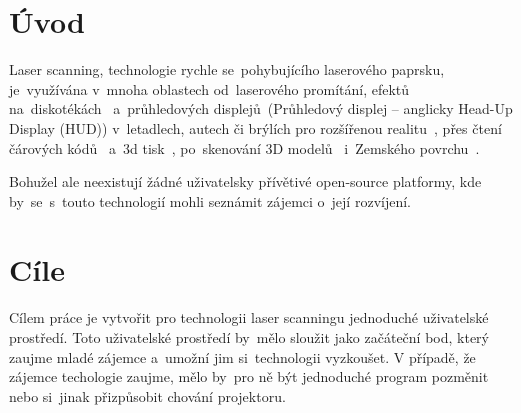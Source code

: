 \chapter*{Úvod}


Laser scanning, technologie rychle se~pohybujícího laserového paprsku, je~využívána v~mnoha oblastech od~laserového promítání, efektů na~diskotékách~\cite{laser-projection} a~průhledových displejů~(Průhledový displej -- anglicky Head-Up Display (HUD)) v~letadlech, autech či brýlích pro rozšířenou realitu~\cite{laser-huds}, přes čtení čárových kódů~\cite{history-of-barcode-scanning} a~3d tisk~\cite{Photo-curing-3D-printing}, po~skenování 3D modelů~\cite{3d-model-scan} i~Zemského povrchu~\cite{heightmaps}.

Bohužel ale neexistují žádné uživatelsky přívětivé open-source platformy, kde by~se~s~touto technologií mohli seznámit zájemci o~její rozvíjení.

\chapter{Cíle}
Cílem práce je vytvořit pro technologii laser scanningu jednoduché uživatelské prostředí.
Toto uživatelské prostředí by~mělo sloužit jako začáteční bod, který zaujme mladé zájemce a~umožní jim si~technologii vyzkoušet.
V případě, že zájemce techologie zaujme, mělo by~pro ně být jednoduché program pozměnit nebo si~jinak přizpůsobit chování projektoru.

